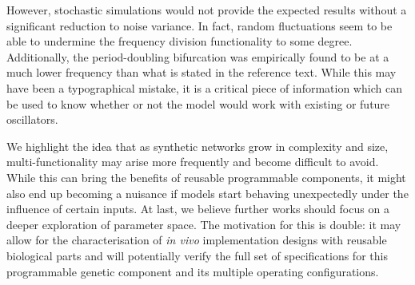   However, stochastic simulations would not provide the expected results without a significant reduction to noise variance.
  In fact, random fluctuations seem to be able to undermine the frequency division functionality to some degree.
  Additionally, the period-doubling bifurcation was empirically found to be at a much lower frequency than what is stated in the reference text.
  While this may have been a typographical mistake, it is a critical piece of information which can be used to know whether or not the model would work with existing or future oscillators.

  We highlight the idea that as synthetic networks grow in complexity and size, multi-functionality may arise more frequently and become difficult to avoid.
  While this can bring the benefits of reusable programmable components, it might also end up becoming a nuisance if models start behaving unexpectedly under the influence of certain inputs.
  At last, we believe further works should focus on a deeper exploration of parameter space.
  The motivation for this is double: it may allow for the characterisation of \textit{in vivo} implementation designs with reusable biological parts and will potentially verify the full set of specifications for this programmable genetic component and its multiple operating configurations.
